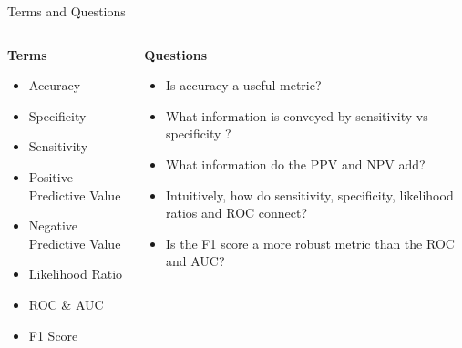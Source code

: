 \documentclass[10pt, xcolor=table]{beamer}
\begin{document}
\begin{frame}{Terms and Questions}
	\begin{columns}[T]
		\begin{column}{0.4\textwidth}\centering
			\textbf{Terms}
			\begin{itemize}
				\item Accuracy
				\item Specificity
				\item Sensitivity
				\item Positive Predictive Value 
				\item Negative Predictive Value 
				\item Likelihood Ratio
				\item ROC \& AUC
				\item F1 Score
			\end{itemize}
		\end{column}
		\begin{column}{0.6\textwidth}\centering
			\textbf{Questions}
			\begin{itemize}
				\item Is accuracy a useful metric?
				\item What information is conveyed by sensitivity vs specificity ?
				\item What information do the PPV and NPV add?
				\item Intuitively, how do sensitivity, specificity, likelihood ratios and ROC connect?
				\item Is the F1 score a more robust metric than the ROC and AUC?				
			\end{itemize}
		\end{column}	
	\end{columns}
\end{frame}
\end{document}
